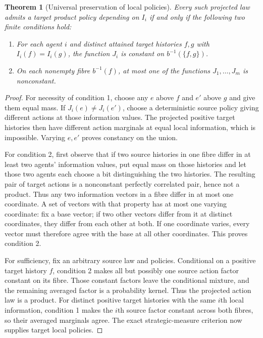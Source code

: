 \documentclass[11pt]{article}
\newtheorem{theorem}{Theorem}\newtheorem{proposition}{Proposition}
\begin{document}
\begin{theorem}[Universal preservation of local policies]
Every such projected law admits a target product policy depending on $I_i$ if and only if the following two finite conditions hold:
\begin{enumerate}
\item For each agent $i$ and distinct attained target histories $f,g$ with $I_i(f)=I_i(g)$, the function $J_i$ is constant on $b^{-1}(\{f,g\})$.
\item On each nonempty fibre $b^{-1}(f)$, at most one of the functions $J_1,\ldots,J_m$ is nonconstant.
\end{enumerate}
\end{theorem}
\begin{proof}
For necessity of condition 1, choose any $e$ above $f$ and $e'$ above $g$ and give them equal mass. If $J_i(e)\ne J_i(e')$, choose a deterministic source policy giving different actions at those information values. The projected positive target histories then have different action marginals at equal local information, which is impossible. Varying $e,e'$ proves constancy on the union.

For condition 2, first observe that if two source histories in one fibre differ in at least two agents' information values, put equal mass on those histories and let those two agents each choose a bit distinguishing the two histories. The resulting pair of target actions is a nonconstant perfectly correlated pair, hence not a product. Thus any two information vectors in a fibre differ in at most one coordinate. A set of vectors with that property has at most one varying coordinate: fix a base vector; if two other vectors differ from it at distinct coordinates, they differ from each other at both. If one coordinate varies, every vector must therefore agree with the base at all other coordinates. This proves condition 2.

For sufficiency, fix an arbitrary source law and policies. Conditional on a positive target history $f$, condition 2 makes all but possibly one source action factor constant on its fibre. Those constant factors leave the conditional mixture, and the remaining averaged factor is a probability kernel. Thus the projected action law is a product. For distinct positive target histories with the same $i$th local information, condition 1 makes the $i$th source factor constant across both fibres, so their averaged marginals agree. The exact strategic-measure criterion now supplies target local policies.
\end{proof}
\end{document}
